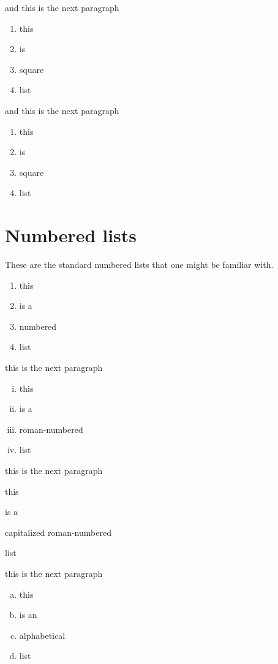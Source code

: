 and this is the next paragraph

\begin{enumerate}[sqr]
    \item this
    \item is
    \item square
    \item list
\end{enumerate}

and this is the next paragraph 

\begin{enumerate}[bsq]
    \item this
    \item is
    \item square
    \item list
\end{enumerate}

\section{Numbered lists}
These are the standard numbered lists that one might be familiar with.
\begin{enumerate}
    \item this
    \item is a
    \item numbered
    \item list
\end{enumerate}

this is the next paragraph

\begin{enumerate}[i.]
    \item this
    \item is a
    \item roman-numbered
    \item list
\end{enumerate}


this is the next paragraph

\begin{enumerate}[I{]}]
    \item this
    \item is a
    \item capitalized roman-numbered
    \item list
\end{enumerate}

this is the next paragraph

\begin{enumerate}[a)]
    \item this
    \item is an
    \item alphabetical
    \item list
\end{enumerate}

